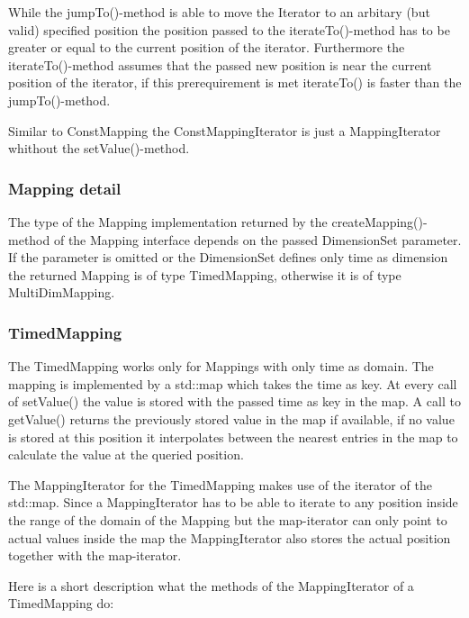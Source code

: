 While the jumpTo()-method is able to move the Iterator to an arbitary (but
valid) specified position the position passed to the iterateTo()-method has to
be greater or equal to the current position of the iterator. Furthermore the
iterateTo()-method assumes that the passed new position is near the current
position of the iterator, if this prerequirement is met iterateTo() is faster
than the jumpTo()-method.
\newline

Similar to ConstMapping the ConstMappingIterator is just a MappingIterator
whithout the setValue()-method.

\subsubsection{Mapping detail}
\label{mapping detail}

The type of the Mapping implementation returned by the createMapping()-method
of the Mapping interface depends on the passed DimensionSet parameter. If the
parameter is omitted or the DimensionSet defines only time as dimension the
returned Mapping is of type TimedMapping, otherwise it is of type
MultiDimMapping.

\subsubsection{TimedMapping}

The TimedMapping works only for Mappings with only time as domain. The mapping
is implemented by a std::map which takes the time as key. At every call of
setValue() the value is stored with the passed time as key in the map.
A call to getValue() returns the previously stored value in the map if
available, if no value is stored at this position it interpolates between the
nearest entries in the map to calculate the value at the queried position. 
\newline

The MappingIterator for the TimedMapping makes use of the iterator of the
std::map. Since a MappingIterator has to be able to iterate to any
position inside the range of the domain of the Mapping but the map-iterator can
only point to actual values inside the map the MappingIterator also stores the
actual position together with the map-iterator. 

Here is a short description what the methods of the MappingIterator of a
TimedMapping do:

